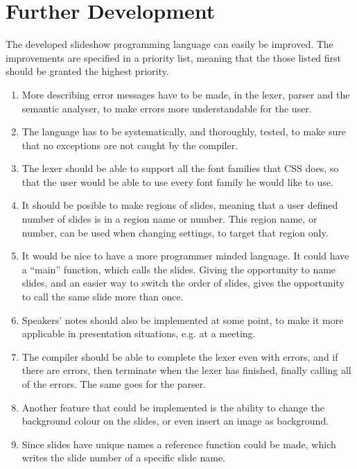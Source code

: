 \chapter{Further Development}
\label{sec:furtherdev}
The developed slideshow programming language can easily be improved. The improvements are specified in a priority list, meaning that the those listed first should be granted the highest priority.

\begin{enumerate}
	\item More describing error messages have to be made, in the lexer, parser and the semantic analyser, to make errors more understandable for the user.
	\item The language has to be systematically, and thoroughly, tested, to make sure that no exceptions are not caught by the compiler.
	\item The lexer should be able to support all the font families that CSS does, so that the user would be able to use every font family he would like to use.
	\item It should be posible to make regions of slides, meaning that a user defined number of slides is in a region name or number. This region name, or number, can be used when changing settings, to target that region only.
	\item It would be nice to have a more programmer minded language. It could have a ``main'' function, which calls the slides. Giving the opportunity to name slides, and an easier way to switch the order of slides, gives the opportunity to call the same slide more than once.
	\item Speakers' notes should also be implemented at some point, to make it more applicable in presentation situations, e.g. at a meeting.
	\item The compiler should be able to complete the lexer even with errors, and if there are errors, then terminate when the lexer has finished, finally calling all of the errors. The same goes for the parser.
	\item Another feature that could be implemented is the ability to change the background colour on the slides, or even insert an image as background.
	\item Since slides have unique names a reference function could be made, which writes the slide number of a specific slide name.
\end{enumerate}